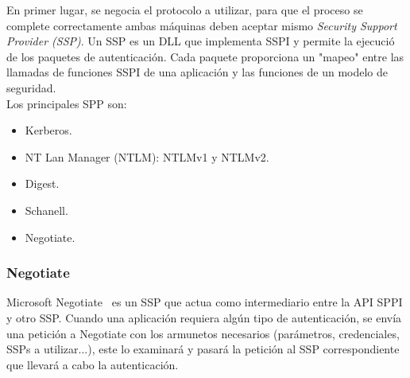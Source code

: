En primer lugar, se negocia el protocolo a utilizar, para que el proceso se complete correctamente ambas máquinas deben aceptar mismo {\it Security Support Provider (SSP)}. Un SSP es un DLL que implementa SSPI y permite la ejecució de los paquetes de autenticación. Cada paquete proporciona un "mapeo" entre las llamadas de funciones SSPI de una aplicación y las funciones de un modelo de seguridad.\\

Los principales SPP son: 

\begin{itemize}

\item Kerberos.
\begin{listing}[style=consola, numbers=none]
\end{listing}

\item NT Lan Manager (NTLM): NTLMv1 y NTLMv2.
\begin{listing}[style=consola, numbers=none]
\end{listing}

\item Digest.
\begin{listing}[style=consola, numbers=none]
\end{listing}

\item Schanell.
\begin{listing}[style=consola, numbers=none]
\end{listing}

\item Negotiate.
\begin{listing}[style=consola, numbers=none]
\end{listing}

\end{itemize}

\subsubsection{Negotiate}

Microsoft Negotiate~\cite{Capitulo2:Negotiate} es un SSP que actua como intermediario entre la API SPPI y otro SSP. Cuando una aplicación requiera algún tipo de autenticación, se envía una petición a Negotiate con los armunetos necesarios (parámetros, credenciales, SSPs a utilizar...), este lo examinará y pasará la petición al SSP correspondiente que llevará a cabo la autenticación. \\

